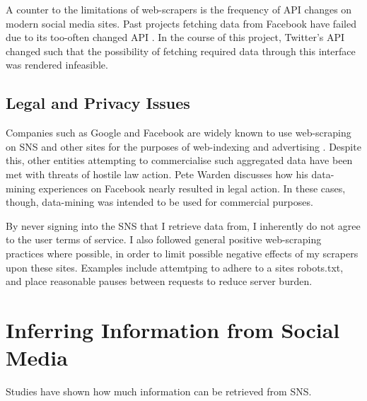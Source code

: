 
A counter to the limitations of web-scrapers is the frequency of API changes on modern social media sites. Past projects fetching data from Facebook have failed due to its too-often changed API \cite{}. In the course of this project, Twitter's API changed such that the possibility of fetching required data through this interface was rendered infeasible. 



\subsection{Legal and Privacy Issues}

Companies such as Google and Facebook are widely known to use web-scraping on SNS and other sites for the purposes of web-indexing and advertising \cite{}. Despite this, other entities attempting to commercialise such aggregated data have been met with threats of hostile law action. Pete Warden discusses how his data-mining experiences on Facebook nearly resulted in legal action. In these cases, though, data-mining was intended to be used for commercial purposes. 

By never signing into the SNS that I retrieve data from, I inherently do not agree to the user terms of service. I also followed general positive web-scraping practices where possible, in order to limit possible negative effects of my scrapers upon these sites. Examples include attemtping to adhere to a sites robots.txt, and place reasonable pauses between requests to reduce server burden. 


\section{Inferring Information from Social Media}

Studies have shown how much information can be retrieved from SNS. 

